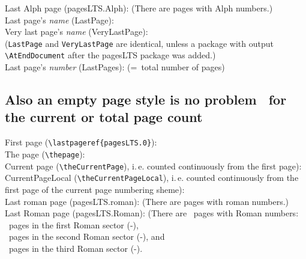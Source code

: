 \documentclass[british]{article}
\begin{document}
\noindent Last Alph page (pagesLTS.Alph): 
(There are  pages with Alph numbers.)\\

\noindent Last page's \textit{name} (LastPage): \\

\noindent Very last page's \textit{name} (VeryLastPage): \\
(\texttt{LastPage} and \texttt{VeryLastPage} are identical, unless
a package with output \linebreak
\texttt{\textbackslash AtEndDocument} after the \textsf{pagesLTS} package
was added.)\\

\noindent Last page's \textit{number} (LastPages): 
(=~total number of pages)\\

\lipsum[1-4]
\newpage

\subsection[Empty page style]{Also an empty page style is no problem\ %
for the current or total page count}

\bigskip

\thispagestyle{empty}

\noindent First page (\texttt{\textbackslash lastpageref\{pagesLTS.0\}}):
\\

\noindent The page (\texttt{\textbackslash thepage}): \thepage \\

\noindent Current page (\texttt{\textbackslash theCurrentPage}),
i.\,e. counted continuously from the first page): \theCurrentPage \\

\noindent CurrentPageLocal (\texttt{\textbackslash theCurrentPageLocal}),
i.\,e. counted continuously from the first page of the
current page numbering sheme): \theCurrentPageLocal \\

\noindent Last roman page (pagesLTS.roman): 
(There are  pages with roman numbers.)\\

\noindent Last Roman page (pagesLTS.Roman): 
(There are ~pages with Roman numbers:\\
~pages in the first Roman sector
(\pageref{Roman}{\hskip3em }-),\\
~pages in the second Roman sector
(\pageref{Roman2}{\hskip3em }-), and\\
~pages in the third Roman sector
(\pageref{Roman3}{\hskip3em }-).\\
\end{document}
